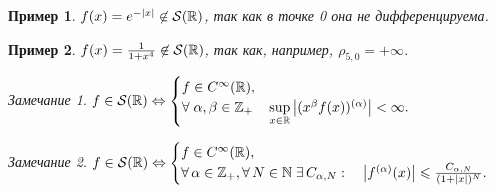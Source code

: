\documentclass[a5paper, 10pt]{article}
\theoremstyle{definition}
\theoremstyle{plain}
\newtheorem{Ex}{Пример}
\theoremstyle{remark}
\newtheorem*{Note}{Замечание}
\begin{document}
    \begin{Ex}
        $f(x) = e^{-|x|} \not \in \mathcal{S}(\mathbb{R})$, так как в точке 0 она не дифференцируема.
    \end{Ex}
    \begin{Ex}
        $f(x) = \frac{1}{1+x^4} \not \in \mathcal{S}(\mathbb{R})$, так как, например, $\rho_{5,0} = +\infty$.
    \end{Ex}

    \begin{Note}
        $f\in \mathcal{S}(\mathbb{R}) \Leftrightarrow \begin{cases}
            f\in C^{\infty}(\mathbb{R}),\\
            \forall \; \alpha,\beta\in \mathbb{Z}_+ \quad \sup\limits_{x\in \mathbb{R}} \left|(x^\beta f(x))^{(\alpha)}\right| < \infty.
        \end{cases}$
    \end{Note}
    \begin{Note}
        $f\in \mathcal{S}(\mathbb{R}) \Leftrightarrow \begin{cases}
            f\in C^{\infty}(\mathbb{R}),\\
            \forall \, \alpha\in \mathbb{Z}_+, \forall \, N\in \mathbb{N} \; \exists \, C_{\alpha,N}:  \quad \left|f^{(\alpha)}(x)\right| \leqslant \frac{C_{\alpha, N}}{(1+|x|)^N}.
        \end{cases}$
    \end{Note}
\end{document}

